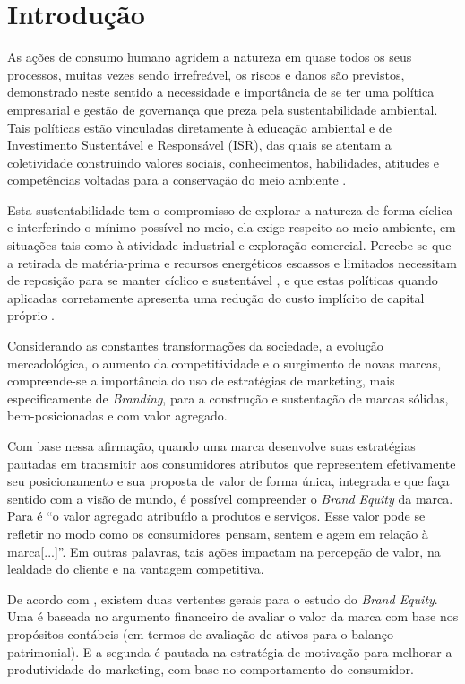 \section{Introdução}

As ações de consumo humano agridem a natureza em quase todos os seus processos, muitas vezes sendo irrefreável, os riscos e danos são previstos\cite{Melo2020}, demonstrado neste sentido a necessidade e importância de se ter uma política empresarial e gestão de governança que preza pela sustentabilidade ambiental. Tais políticas estão vinculadas diretamente à educação ambiental e de Investimento Sustentável e Responsável (ISR), das quais se atentam a coletividade construindo valores sociais, conhecimentos, habilidades, atitudes e competências voltadas para a conservação do meio ambiente \cite{Brasil1999LeiProvidencias.}.

Esta sustentabilidade tem o compromisso de explorar a natureza de forma cíclica e interferindo o mínimo possível no meio, ela exige respeito ao meio ambiente, em situações tais como à atividade industrial e exploração comercial. Percebe-se que a retirada de matéria-prima e recursos energéticos escassos e limitados necessitam de reposição para se manter cíclico e sustentável \cite{Souza2019}, e que estas políticas quando aplicadas corretamente apresenta uma redução do custo implícito de capital próprio \cite{Gupta2018EnvironmentalEvidence}.

Considerando as constantes transformações da sociedade, a evolução mercadológica, o aumento da competitividade e o surgimento de novas marcas, compreende-se a importância do uso de estratégias de marketing, mais especificamente de \textit{Branding}, para a construção e sustentação de marcas sólidas, bem-posicionadas e com valor agregado. 

Com base nessa afirmação, quando uma marca desenvolve suas estratégias pautadas em transmitir aos consumidores atributos que representem efetivamente seu posicionamento e sua proposta de valor de forma única, integrada e que faça sentido com a visão de mundo, é possível compreender o \textit{Brand Equity} da marca. Para  é “o valor agregado atribuído a produtos e serviços. Esse valor pode se refletir no modo como os consumidores pensam, sentem e agem em relação à marca[...]”. Em outras palavras, tais ações impactam na percepção de valor, na lealdade do cliente e na vantagem competitiva.

De acordo com \cite{Keller-Aviram202187}, existem duas vertentes gerais para o estudo do \textit{Brand Equity}. Uma é baseada no argumento financeiro de avaliar o valor da marca com base nos propósitos contábeis (em termos de avaliação de ativos para o balanço patrimonial). E a segunda é pautada na estratégia de motivação para melhorar a produtividade do marketing, com base no comportamento do consumidor. 

